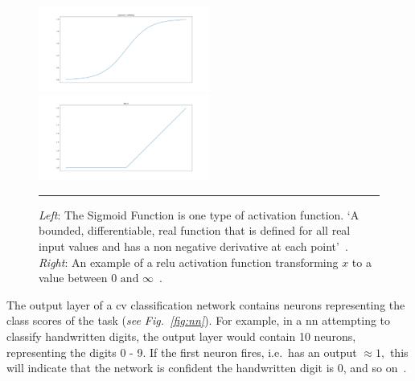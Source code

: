 \begin{figure}[H]
    \includegraphics[width=0.5\textwidth]{media/literature/sigmoid.png}
    \includegraphics[width=0.5\textwidth]{media/literature/relu.png}
    \rule{35em}{0.5pt}
    \caption[Examples of activation functions]{\textit{Left}: The Sigmoid Function is one type of activation function. `A bounded, differentiable, real function that is defined for all real input values and has a non negative derivative at each point'~\citep{Han1995}. \textit{Right}: An example of a \Gls{relu} activation function transforming $x$ to a value between $0 \text{ and } \infty$~\citep{Malik2019activation}.}\label{fig:activation}
\end{figure}


The output layer of a \gls{cv} classification network contains neurons representing the class
scores of the task (\textit{see Fig.~\ref{fig:nn}}). For example, in a \gls{nn} attempting to classify handwritten
digits, the output layer would contain 10 neurons, representing the digits 0 - 9.
If the first neuron fires, i.e.\ has an output $\approx 1,$ this will indicate that the
network is confident the handwritten digit is 0, and so on~\citep{Nielsen2015}.


